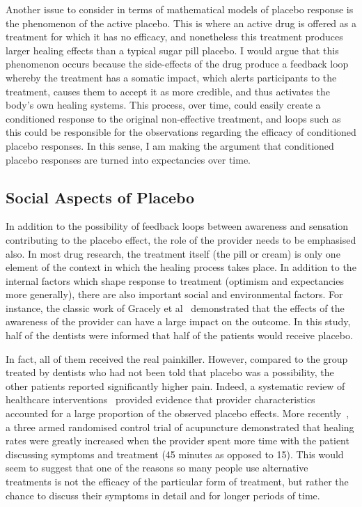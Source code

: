 Another issue to consider in terms of mathematical models of placebo response is the phenomenon of the active placebo. This is where an active drug is offered as a treatment for which it has no efficacy, and nonetheless this treatment produces larger healing effects than a typical sugar pill placebo. I would argue that this phenomenon occurs because the side-effects of the drug produce  a feedback loop whereby the treatment has a somatic impact, which alerts participants to the treatment, causes them to accept it as more credible, and thus activates the body's own healing systems. This process, over time, could easily create a conditioned response to the original non-effective treatment, and loops such as this could be responsible for the observations regarding the efficacy of conditioned placebo responses. In this sense, I am making the argument that conditioned placebo responses are turned into expectancies over time.   


\subsection{Social Aspects of Placebo}

In addition to the possibility of feedback loops between awareness and sensation contributing to the placebo effect, the role of the provider needs to be emphasised also. In most drug research, the treatment itself (the pill or cream) is only one element of the context in which the healing process takes place. In addition to the internal factors which shape response to treatment (optimism and expectancies more generally), there are also important social and environmental factors. For instance, the classic work of Gracely et al~\cite{Gracely1985} demonstrated that the effects of the awareness of the provider can have a large impact on the outcome. In this study, half of the dentists were informed that half of the patients would receive placebo. 

In fact, all of them received the real painkiller. However, compared to the group treated by dentists who had not been told that placebo was a possibility, the other patients reported significantly higher pain. Indeed, a systematic review of healthcare interventions~\cite{DiBlasi2001} provided evidence that provider characteristics accounted for a large proportion of the observed placebo effects. More recently~\cite{Kaptchuk2008}, a three armed randomised control trial of acupuncture demonstrated that healing rates were greatly increased when the provider spent more time with the patient discussing symptoms and treatment (45 minutes as opposed to 15). This would seem to suggest that one of the reasons so many people use alternative treatments is not the efficacy of the particular form of treatment, but rather the chance to discuss their symptoms in detail and for longer periods of time.

